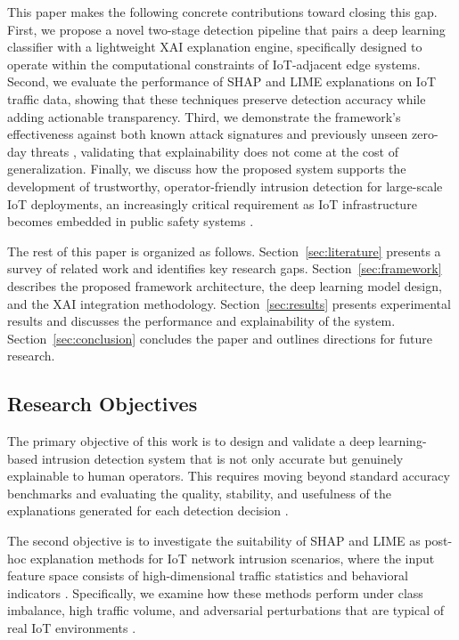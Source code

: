 \documentclass[a4paper,fleqn]{cas-dc}
\numberwithin{equation}{section}
\begin{document}
This paper makes the following concrete contributions toward closing this gap. First, we propose a novel two-stage detection pipeline that pairs a deep learning classifier with a lightweight XAI explanation engine, specifically designed to operate within the computational constraints of IoT-adjacent edge systems. Second, we evaluate the performance of SHAP and LIME explanations on IoT traffic data, showing that these techniques preserve detection accuracy while adding actionable transparency. Third, we demonstrate the framework's effectiveness against both known attack signatures and previously unseen zero-day threats \cite{aspg2025zeroday}, validating that explainability does not come at the cost of generalization. Finally, we discuss how the proposed system supports the development of trustworthy, operator-friendly intrusion detection for large-scale IoT deployments, an increasingly critical requirement as IoT infrastructure becomes embedded in public safety systems \cite{jes2024iot, islam2023robust}.

The rest of this paper is organized as follows. Section~\ref{sec:literature} presents a survey of related work and identifies key research gaps. Section~\ref{sec:framework} describes the proposed framework architecture, the deep learning model design, and the XAI integration methodology. Section~\ref{sec:results} presents experimental results and discusses the performance and explainability of the system. Section~\ref{sec:conclusion} concludes the paper and outlines directions for future research.

\subsection{Research Objectives}

The primary objective of this work is to design and validate a deep learning-based intrusion detection system that is not only accurate but genuinely explainable to human operators. This requires moving beyond standard accuracy benchmarks and evaluating the quality, stability, and usefulness of the explanations generated for each detection decision \cite{das2023trustworthy, frontiers2025ids}.

The second objective is to investigate the suitability of SHAP and LIME as post-hoc explanation methods for IoT network intrusion scenarios, where the input feature space consists of high-dimensional traffic statistics and behavioral indicators \cite{ieee2024limeshap}. Specifically, we examine how these methods perform under class imbalance, high traffic volume, and adversarial perturbations that are typical of real IoT environments \cite{islam2023robust, jes2024iot}.
\end{document}
